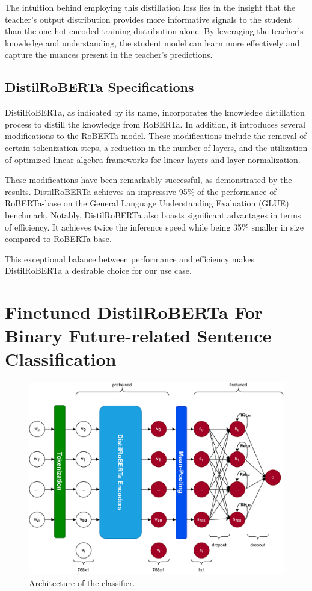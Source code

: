 \documentclass[a4paper,10pt]{report} %
\begin{document}
The intuition behind employing this distillation loss lies in the insight that the teacher's output distribution provides more informative signals to the student than the one-hot-encoded training distribution alone. By leveraging the teacher's knowledge and understanding, the student model can learn more effectively and capture the nuances present in the teacher's predictions.

\subsection{DistilRoBERTa Specifications} %
DistilRoBERTa, as indicated by its name, incorporates the knowledge distillation process to distill the knowledge from RoBERTa. In addition, it introduces several modifications to the RoBERTa model. These modifications include the removal of certain tokenization steps, a reduction in the number of layers, and the utilization of optimized linear algebra frameworks for linear layers and layer normalization.

These modifications have been remarkably successful, as demonstrated by the results. DistilRoBERTa achieves an impressive 95\% of the performance of RoBERTa-base on the General Language Understanding Evaluation (GLUE) benchmark. Notably, DistilRoBERTa also boasts significant advantages in terms of efficiency. It achieves twice the inference speed while being 35\% smaller in size compared to RoBERTa-base. 

This exceptional balance between performance and efficiency makes DistilRoBERTa a desirable choice for our use case.

\section{Finetuned DistilRoBERTa For Binary Future-related Sentence Classification}
\begin{figure}
  \centering
  \includegraphics[width=15cm]{img/classifier_archi.pdf}
  \caption{Architecture of the classifier.}
  \label{fig:classifier_archi}
\end{figure}
\end{document}
